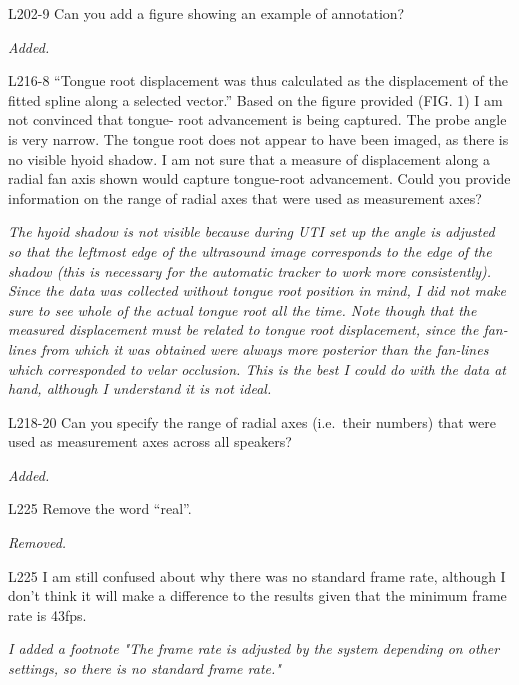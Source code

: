 \documentclass[]{article}
\begin{document}
L202-9 Can you add a figure showing an example of annotation?

\begin{adjustwidth}{1cm}{} \textit{
Added.
} \end{adjustwidth}

L216-8 ``Tongue root displacement was thus calculated as the
displacement of the fitted spline along a selected vector.'' Based on
the figure provided (FIG. 1) I am not convinced that tongue- root
advancement is being captured. The probe angle is very narrow. The
tongue root does not appear to have been imaged, as there is no visible
hyoid shadow. I am not sure that a measure of displacement along a
radial fan axis shown would capture tongue-root advancement. Could you
provide information on the range of radial axes that were used as
measurement axes?

\begin{adjustwidth}{1cm}{} \textit{
The hyoid shadow is not visible because during UTI set up the angle is adjusted so that the leftmost edge of the ultrasound image corresponds to the edge of the shadow (this is necessary for the automatic tracker to work more consistently). Since the data was collected without tongue root position in mind, I did not make sure to see whole of the actual tongue root all the time. Note though that the measured displacement must be related to tongue root displacement, since the fan-lines from which it was obtained were always more posterior than the fan-lines which corresponded to velar occlusion. This is the best I could do with the data at hand, although I understand it is not ideal.
} \end{adjustwidth}

L218-20 Can you specify the range of radial axes (i.e.~their numbers)
that were used as measurement axes across all speakers?

\begin{adjustwidth}{1cm}{} \textit{
Added.
} \end{adjustwidth}

L225 Remove the word ``real''.

\begin{adjustwidth}{1cm}{} \textit{
Removed.
} \end{adjustwidth}

L225 I am still confused about why there was no standard frame rate,
although I don't think it will make a difference to the results given
that the minimum frame rate is 43fps.

\begin{adjustwidth}{1cm}{} \textit{
I added a footnote "The frame rate is adjusted by the system depending on other settings, so there is no standard frame rate."
} \end{adjustwidth}
\end{document}
